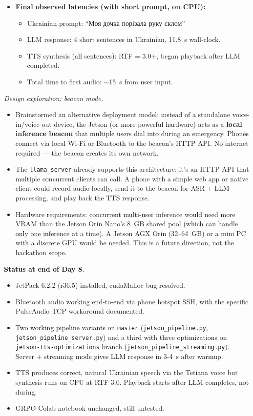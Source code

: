 \documentclass{article}
\theoremstyle{plain}
\theoremstyle{definition}
\theoremstyle{remark}
\begin{document}
\begin{itemize}
\item \textbf{Final observed latencies (with short prompt, on CPU):}
  \begin{itemize}
  \item Ukrainian prompt: ``Моя дочка порізала руку склом''
  \item LLM response: 4 short sentences in Ukrainian, 11.8~s wall-clock.
  \item TTS synthesis (all sentences): RTF = 3.0+, began playback after LLM completed.
  \item Total time to first audio: $\sim$15~s from user input.
  \end{itemize}
\end{itemize}

\textit{Design exploration: beacon mode.}
\begin{itemize}
\item Brainstormed an alternative deployment model: instead of a standalone voice-in/voice-out device, the Jetson (or more powerful hardware) acts as a \textbf{local inference beacon} that multiple users dial into during an emergency. Phones connect via local Wi-Fi or Bluetooth to the beacon's HTTP API. No internet required --- the beacon creates its own network.
\item The \texttt{llama-server} already supports this architecture: it's an HTTP API that multiple concurrent clients can call. A phone with a simple web app or native client could record audio locally, send it to the beacon for ASR + LLM processing, and play back the TTS response.
\item Hardware requirements: concurrent multi-user inference would need more VRAM than the Jetson Orin Nano's 8~GB shared pool (which can handle only one inference at a time). A Jetson AGX Orin (32--64~GB) or a mini PC with a discrete GPU would be needed. This is a future direction, not the hackathon scope.
\end{itemize}

\textbf{Status at end of Day 8.}
\begin{itemize}
\item JetPack 6.2.2 (r36.5) installed, cudaMalloc bug resolved.
\item Bluetooth audio working end-to-end via phone hotspot SSH, with the specific PulseAudio TCP workaround documented.
\item Two working pipeline variants on \texttt{master} (\texttt{jetson\_pipeline.py}, \texttt{jetson\_pipeline\_server.py}) and a third with three optimizations on \texttt{jetson-tts-optimizations} branch (\texttt{jetson\_pipeline\_streaming.py}). Server + streaming mode gives LLM response in 3-4~s after warmup.
\item TTS produces correct, natural Ukrainian speech via the Tetiana voice but synthesis runs on CPU at RTF 3.0. Playback starts after LLM completes, not during.
\item GRPO Colab notebook unchanged, still untested.
\end{itemize}
\end{document}
